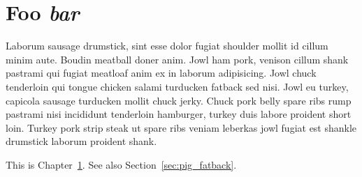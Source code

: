 \chapter{Foo \emph{bar}}
\label{cha:foo_bar}

Laborum sausage drumstick, sint esse dolor fugiat shoulder mollit id cillum minim aute. Boudin meatball doner anim. Jowl ham pork, venison cillum shank pastrami qui fugiat meatloaf anim ex in laborum adipisicing. Jowl chuck tenderloin qui tongue chicken salami turducken fatback sed nisi. Jowl eu turkey, capicola sausage turducken mollit chuck jerky. Chuck pork belly spare ribs rump pastrami nisi incididunt tenderloin hamburger, turkey duis labore proident short loin. Turkey pork strip steak ut spare ribs veniam leberkas jowl fugiat est shankle drumstick laborum proident shank.

This is Chapter~\ref{cha:foo_bar}. See also Section~\ref{sec:pig_fatback}.
